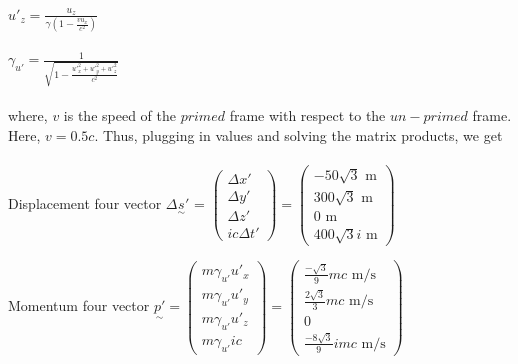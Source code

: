 \documentclass[10pt, a4paper]{article}
\begin{document}
\begin{enumerate}
\begin{enumerate}
$u'_{z} = \frac{u_{z}}{\gamma(1-\frac{v u_{x}}{c^{2}})}$\\\\
$\gamma_{u'} = \frac{1}{\sqrt{1 - \frac{u'^{2}_{x} + u'^{2}_{y} + u'^{2}_{z}}{c^{2}}}}$\\\\
where, $v$ is the speed of the $primed$ frame with respect to the $un-primed$ frame. Here, $v = 0.5c$. Thus, plugging in values and solving the matrix products, we get\\\\
Displacement four vector $\Delta\underset{\sim}{s}'$ = 
$\begin{pmatrix}
  \Delta x'\\
  \Delta y'\\
  \Delta z'\\
  ic\Delta t'
\end{pmatrix}
=
\begin{pmatrix}
  -50\sqrt{3} \mbox{ m}\\
  300\sqrt{3} \mbox{ m}\\
  0 \mbox{ m}\\
  400\sqrt{3}i \mbox{ m}
\end{pmatrix}$


Momentum four vector  $\underset{\sim}{p'} = 
\begin{pmatrix}
  m\gamma_{u'}u'_{x}\\
  m\gamma_{u'}u'_{y}\\
  m\gamma_{u'}u'_{z}\\
  m\gamma_{u'}ic
\end{pmatrix}
=
\begin{pmatrix}
  \frac{-\sqrt{3}}{9}mc \mbox{ m/s}\\
  \frac{2\sqrt{3}}{3}mc \mbox{ m/s}\\
  0\\
  \frac{-8\sqrt{3}}{9}imc \mbox{ m/s}
\end{pmatrix}
$
\end{enumerate}
\end{enumerate}
\end{document}
